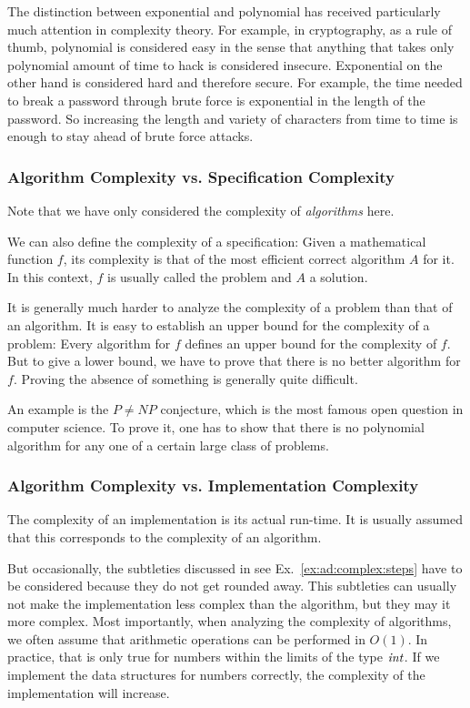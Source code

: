 The distinction between exponential and polynomial has received particularly much attention in complexity theory.
For example, in cryptography, as a rule of thumb, polynomial is considered easy in the sense that anything that takes only polynomial amount of time to hack is considered insecure.
Exponential on the other hand is considered hard and therefore secure.
For example, the time needed to break a password through brute force is exponential in the length of the password.
So increasing the length and variety of characters from time to time is enough to stay ahead of brute force attacks.

\subsubsection{Algorithm Complexity vs. Specification Complexity}

Note that we have only considered the complexity of \emph{algorithms} here.

We can also define the complexity of a specification: Given a mathematical function $f$, its complexity is that of the most efficient correct algorithm $A$ for it.
In this context, $f$ is usually called the problem and $A$ a solution.

It is generally much harder to analyze the complexity of a problem than that of an algorithm.
It is easy to establish an upper bound for the complexity of a problem: Every algorithm for $f$ defines an upper bound for the complexity of $f$.
But to give a lower bound, we have to prove that there is no better algorithm for $f$.
Proving the absence of something is generally quite difficult.

An example is the $P\neq NP$ conjecture, which is the most famous open question in computer science.
To prove it, one has to show that there is no polynomial algorithm for any one of a certain large class of problems.

\subsubsection{Algorithm Complexity vs. Implementation Complexity}

The complexity of an implementation is its actual run-time.
It is usually assumed that this corresponds to the complexity of an algorithm.

But occasionally, the subtleties discussed in see Ex.~\ref{ex:ad:complex:steps} have to be considered because they do not get rounded away.
This subtleties can usually not make the implementation less complex than the algorithm, but they may it more complex.
Most importantly, when analyzing the complexity of algorithms, we often assume that arithmetic operations can be performed in $O(1)$.
In practice, that is only true for numbers within the limits of the type $\mathit{int}$.
If we implement the data structures for numbers correctly, the complexity of the implementation will increase.

